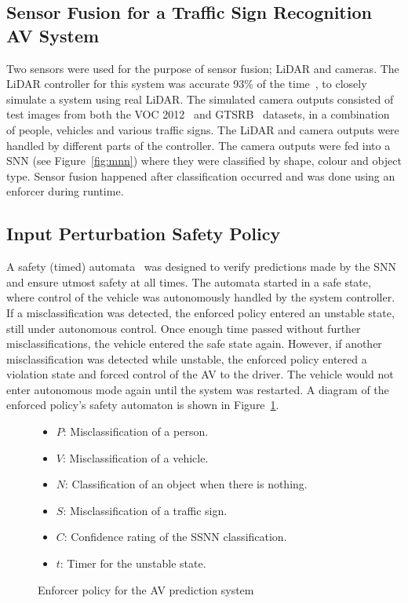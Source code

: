\subsection{Sensor Fusion for a Traffic Sign Recognition AV System}
Two sensors were used for the purpose of sensor fusion; \ac{LiDAR} and cameras.
The \ac{LiDAR} controller for this system was accurate 93\% of the time~\cite{lidarFusion}, to closely simulate a system using real \ac{LiDAR}.
The simulated camera outputs consisted of test images from both the \ac{VOC} 2012~\cite{pascal-voc-2012} and \ac{GTSRB}~\cite{Stallkamp2012-gtsrb} datasets, in a combination of people, vehicles and various traffic signs.
The \ac{LiDAR} and camera outputs were handled by different parts of the controller.
The camera outputs were fed into a \ac{SNN} (see Figure~\ref{fig:mnn}) where they were classified by shape, colour and object type.
Sensor fusion happened after classification occurred and was done using an enforcer during runtime.

\subsection{Input Perturbation Safety Policy}
A safety (timed) automata~\cite{recps} was designed to verify predictions made by the \ac{SNN} and ensure utmost safety at all times.
The automata started in a safe state, where control of the vehicle was autonomously handled by the system controller.
If a misclassification was detected, the enforced policy entered an unstable state, still under autonomous control. 
Once enough time passed without further misclassifications, the vehicle entered the safe state again.
However, if another misclassification was detected while unstable, the enforced policy entered a violation state and forced control of the \ac{AV} to the driver.
The vehicle would not enter autonomous mode again until the system was restarted.
A diagram of the enforced policy's safety automaton is shown in Figure~\ref{fig:signrte}.
\begin{figure}[t]
	\centering
	\scalebox{1.3}{}
	\begin{itemize}
		\item $P$: Misclassification of a person.
		\item $V$: Misclassification of a vehicle.
		\item $N$: Classification of an object when there is nothing.
		\item $S$: Misclassification of a traffic sign.
		\item $C$: Confidence rating of the \ac{SSNN} classification.
		\item $t$: Timer for the unstable state.
	\end{itemize}
	
	\caption{Enforcer policy for the \acf{AV} prediction system}
	\label{fig:signrte}
\end{figure}

